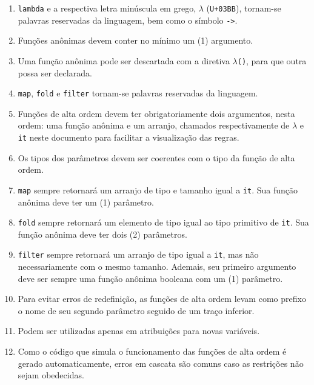 \documentclass{article}
\newenvironment{smallenum}{
    \vspace{-1mm}
    \begin{enumerate}[label=\roman*.]
    \setlength{\parskip}{0pt}
    \setlength{\itemsep}{2pt}
}{
    \vspace{-2mm}
    \end{enumerate}
}
\begin{document}
\begin{smallenum}

\item \texttt{lambda} e a respectiva letra minúscula em grego, $\lambda$
    (\texttt{U+03BB}), tornam-se palavras reservadas da linguagem, bem como
    o símbolo \texttt{->}.

\item Funções anônimas devem conter no mínimo um (1) argumento.

\item Uma função anônima pode ser descartada com a diretiva
    \texttt{$\lambda$()}, para que outra possa ser declarada.

\item \texttt{map}, \texttt{fold} e \texttt{filter} tornam-se palavras
    reservadas da linguagem.

\item Funções de alta ordem devem ter obrigatoriamente dois argumentos,
    nesta ordem: uma função anônima e um arranjo, chamados respectivamente
    de \texttt{$\lambda$} e \texttt{it} neste documento para facilitar a
    visualização das regras.

\item Os tipos dos parâmetros devem ser coerentes com o tipo da função de alta
    ordem.

\item \texttt{map} sempre retornará um arranjo de tipo e tamanho 
    igual a \texttt{it}. Sua função anônima deve ter um (1) parâmetro.

\item \texttt{fold} sempre retornará um elemento de tipo igual ao tipo
    primitivo de \texttt{it}. Sua função anônima deve ter dois (2) parâmetros.

\item \texttt{filter} sempre retornará um arranjo de tipo igual a
    \texttt{it}, mas não necessariamente com o mesmo tamanho. Ademais,
    seu primeiro argumento deve ser sempre uma função anônima booleana
    com um (1) parâmetro.

\item Para evitar erros de redefinição, as funções de alta ordem levam como
    prefixo o nome de seu segundo parâmetro seguido de um traço inferior.

\item Podem ser utilizadas apenas em atribuições para novas variáveis.

\item Como o código que simula o funcionamento das funções de alta ordem
    é gerado automaticamente, erros em cascata são comuns caso as restrições
    não sejam obedecidas.

\end{smallenum}
\end{document}
